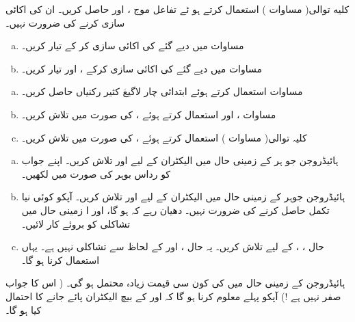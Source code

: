 کلیه توالی( مساوات ) استعمال کرتے ہو ئے تفاعل موج ،  اور  حاصل کریں۔ ان کی اکائی سازی کرنے کی ضرورت نہیں۔ 
\begin{enumerate}[a.]
\item
مساوات  میں دیے گئے  کی اکائی سازی کر کے  تیار کریں۔
\item
مساوات  میں دیے گئے  کی اکائی سازی کرکے ،  اور  تیار کریں۔ 
\end{enumerate}
\begin{enumerate}[a.]
\item
مساوات  استعمال کرتے ہوئے ابتدائی چار لاگیغ کثیر رکنیاں حاصل کریں۔
\item
مساوات ،  اور  استعمال کرتے ہوئے ،  کی صورت میں  تلاش کریں۔
\item
کلیہ توالی( مساوات ) استعمال کرتے ہوئے ،  کی صورت میں  تلاش کریں۔ 
\end{enumerate}
\begin{enumerate}[a.]
\item
ہائیڈروجن جو ہر کے زمینی حال میں الیکٹران کے لیے  اور  تلاش کریں۔ اپنے جواب کو رداس بوہر کی صورت میں لکھیں۔ 
\item
ہائیڈروجن جوہر کے زمینی حال میں الیکٹران کے لیے  اور  تلاش کریں۔  آپکو کوئی نیا تکمل حاصل کرنے کی ضرورت نہیں۔ دھیان رہے کہ 
  ہو گا، اور ا زمینی حال میں تشاکلی کو بروئے کار لائیں۔ 
\item
حال ، ،  کے لیے  تلاش کریں۔  یہ حال ،  اور  کے لحاظ سے تشاکلی نہیں ہے۔ یہاں
 استعمال کرنا ہو گا۔ 
\end{enumerate}
ہائیڈروجن کے زمینی حال میں  کی کون سی قیمت زیادہ محتمل ہو گی۔ ( اس کا جواب صفر نہیں ہے !)  آپکو پہلے معلوم کرنا ہو گا کہ  اور  کے بیچ الیکٹران پائے جانے کا احتمال کیا ہو گا۔
